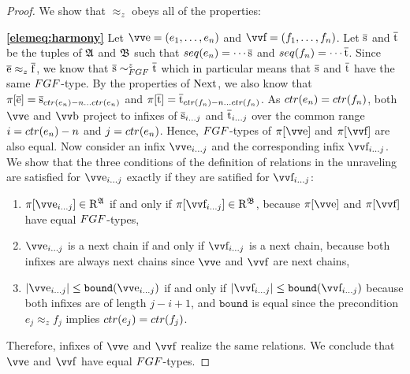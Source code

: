 \begin{proof}
We show that $\approx_{z}$ obeys all of the properties:

\noindent
\textbf{\ref{elemeq:harmony}}
Let $\elemtuptuplee = (e_{1}, \ldots, e_{n})$ and $\elemtuptuplef = (f_{1}, \ldots, f_{n})$.
Let $\overline{\mathrm{s}}$ and $\overline{\mathrm{t}}$ be the tuples of ${\mathfrak{A}}$ and ${\mathfrak{B}}$ such that $\seq{e_{n}} = \cdots \elemtuples$ and $\seq{f_{n}} = \cdots \elemtuplet$.
Since $\overline{\mathrm{e}} \approx_z \overline{\mathrm{f}}$, we know that $\elemtuples \bisimto_{\FGF}^{z} \elemtuplet$ which in particular means that $\overline{\mathrm{s}}$ and $\overline{\mathrm{t}}$ have the same $\FGF$-type.
By the properties of $\mathrm{Next}$, we also know that $\pi[\elemtuplee] = \elemtuples_{\ctr{e_{n}}-n\ldots{}\ctr{e_{n}}}$ and $\pi[\elemtuplet] = \elemtuplet_{\ctr{f_{n}}-n\ldots{}\ctr{f_{n}}}$.
As $\ctr{e_{n}} = \ctr{f_{n}}$, both $\elemtuptuplee$ and $\elemtuptupleb$ project to infixes of $\overline{\mathrm{s}}_{i\ldots{}j}$ and $\overline{\mathrm{t}}_{i\ldots{}j}$ over the common range $i = \ctr{e_{n}} - n$ and $j = \ctr{e_{n}}$.
Hence, $\FGF$-types of $\pi[\elemtuptuplee]$ and $\pi[\elemtuptuplef]$ are also equal.
Now consider an infix $\elemtuptuplee_{i\ldots{}j}$ and the corresponding infix $\elemtuptuplef_{i\ldots{}j}$.
We show that the three conditions of the definition of relations in the unraveling are satisfied for $\elemtuptuplee_{i\ldots{}j}$ exactly if they are satified for $\elemtuptuplef_{i\ldots{}j}$:
\begin{enumerate}
  \item $\pi[\elemtuptuplee_{i\ldots{}j}] \in \relR^{\str{A}}$ if and only if $\pi[\elemtuptuplef_{i\ldots{}j}] \in \relR^{\str{B}}$, because $\pi[\elemtuptuplee]$ and $\pi[\elemtuptuplef]$ have equal $\FGF$-types,
  \item $\elemtuptuplee_{i\ldots{}j}$ is a next chain if and only if $\elemtuptuplef_{i\ldots{}j}$ is a next chain, because both infixes are always next chains since $\elemtuptuplee$ and $\elemtuptuplef$ are next chains,
  \item $|\elemtuptuplee_{i\ldots{}j}| \le \mathtt{bound}(\elemtuptuplee_{i\ldots{}j})$ if and only if $|\elemtuptuplef_{i\ldots{}j}| \le \mathtt{bound}(\elemtuptuplef_{i\ldots{}j})$ because both infixes are of length $j-i+1$, and $\mathtt{bound}$ is equal since the precondition $e_{j} \approx_{z} f_{j}$ implies $\ctr{e_{j}} = \ctr{f_{j}}$.
\end{enumerate}
Therefore, infixes of $\elemtuptuplee$ and $\elemtuptuplef$ realize the same relations.
We conclude that $\elemtuptuplee$ and $\elemtuptuplef$ have equal $\FGF$-types.


\end{proof}
